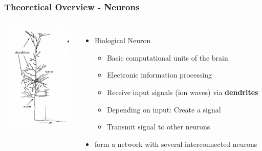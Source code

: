 \documentclass{beamer}
\begin{document}
\begin{frame}
    \frametitle{Theoretical Overview - Neurons}
    \begin{columns}
             \centering
             \includegraphics[height=5cm, width=3.5cm]{figures/neuron_script.png}
              \begin{itemize}
   	
   				\item Biological Neuron
   				\begin{itemize}
   					\item Basic computational units of the brain
   					\item Electronic information processing
   					\item Receive input signals (ion waves) via \textbf{dendrites}
   					\item Depending on input: Create a signal
   					\item Transmit signal to other neurons
   				\end{itemize}
   				
   				\item form a network with several interconnected neurons
 			\end{itemize}
	\end{columns} 
   	
\end{frame}
\end{document}
